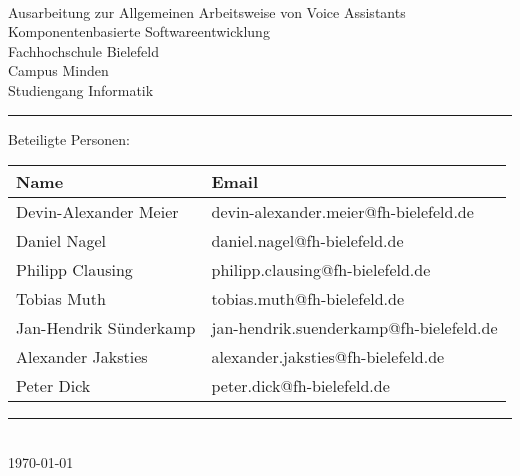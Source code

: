 
\begin{titlepage}
   \mbox{}\vspace{5\baselineskip}\\
   \sffamily\huge
   \centering
   {\Huge Ausarbeitung zur Allgemeinen Arbeitsweise von Voice Assistants} \\
  Komponentenbasierte Softwareentwicklung
   \vspace{3\baselineskip}\\
   \rmfamily\Large
  Fachhochschule Bielefeld \\
  Campus Minden \\
  Studiengang Informatik
   \vspace{2\baselineskip}\\
\noindent\rule{15cm}{0.4pt}
Beteiligte Personen:
\begin{table}[H]
	\tablestyle
	\begin{tabular}{*{2}{v{0.45\textwidth}}}
		\hline
		\textbf{Name} &
		\textbf{Email} \tabularnewline
		\hline
		Devin-Alexander Meier  & devin-alexander.meier@fh-bielefeld.de \tabularnewline
		Daniel Nagel & daniel.nagel@fh-bielefeld.de \tabularnewline
		Philipp Clausing & philipp.clausing@fh-bielefeld.de \tabularnewline
		Tobias Muth & tobias.muth@fh-bielefeld.de \tabularnewline
		Jan-Hendrik Sünderkamp & jan-hendrik.suenderkamp@fh-bielefeld.de \tabularnewline
		Alexander Jaksties & alexander.jaksties@fh-bielefeld.de \tabularnewline
		Peter Dick & peter.dick@fh-bielefeld.de \tabularnewline

	\end{tabular}
\end{table}
   \noindent\rule{15cm}{0.4pt}
      \vspace{1\baselineskip}\\
   \today
\end{titlepage}

